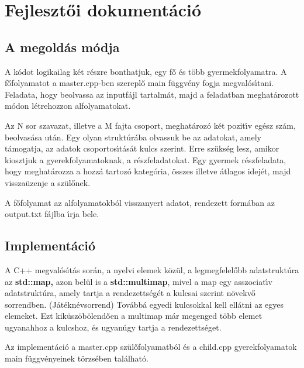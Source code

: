 \documentclass[10pt]{article}
\begin{document}
\section{Fejleszt\H{o}i dokument\'{a}ci\'{o}}
\subsection{A megold\'{a}s m\'{o}dja}

{\normalsize
{\raggedright
A k\'{o}dot logikailag k\'{e}t r\'{e}szre bonthatjuk, egy f\H{o} \'{e}s t\"{o}bb
gyermekfolyamatra. A f\H{o}folyamatot a master.cpp-ben szerepl\H{o} main
f\"{u}ggv\'{e}ny fogja megval\'{o}s\'{\i}tani. Feladata, hogy beolvassa az
inputf\'{a}jl tartalm\'{a}t, majd a feladatban meghat\'{a}rozott m\'{o}don
l\'{e}trehozzon alfolyamatokat.
}
}

{\normalsize
Az N sor szavazat, illetve a M fajta csoport, meghat\'{a}roz\'{o} k\'{e}t
pozit\'{\i}v eg\'{e}sz sz\'{a}m, beolvas\'{a}sa ut\'{a}n. Egy olyan
strukt\'{u}r\'{a}ba olvassuk be az adatokat, amely t\'{a}mogatja, az adatok
csoportos\'{\i}t\'{a}s\'{a}t kulcs szerint. Erre sz\"{u}ks\'{e}g lesz, amikor
kiosztjuk a gyerekfolyamatoknak, a r\'{e}szfeladatokat. Egy gyermek
r\'{e}szfeladata, hogy meghat\'{a}rozza a hozz\'{a} tartoz\'{o} kateg\'{o}ria,
\"{o}sszes illetve \'{a}tlagos idej\'{e}t, majd vissza\"{u}zenje a
sz\"{u}l\H{o}nek.

A f\H{o}folyamat az alfolyamatokb\'{o}l visszanyert adatot, rendezett
form\'{a}ban az output.txt f\'{a}jlba \'{\i}rja bele.
}

\subsection{Implement\'{a}ci\'{o}}

{\normalsize
{\raggedright
A C++ megval\'{o}s\'{\i}t\'{a}s sor\'{a}n, a nyelvi elemek k\"{o}z\"{u}l, a
legmegfelel\H{o}bb adatstrukt\'{u}ra az \textbf{std::map, } azon bel\"{u}l is a
\textbf{std::multimap}, mivel a map egy asszociat\'{\i}v adatstrukt\'{u}ra, amely
tartja a rendezetts\'{e}g\'{e}t a kulcsai szerint n\"{o}vekv\H{o} sorrendben.
(J\'{a}t\'{e}kn\'{e}vsorrend) Tov\'{a}bb\'{a} egyedi kulcsokkal kell ell\'{a}tni
az egyes elemeket. Ezt kik\"{u}sz\"{o}b\"{o}lend\H{o}en a multimap m\'{a}r
megenged t\"{o}bb elemet ugyanahhoz a kulcshoz, \'{e}s ugyan\'{u}gy tartja a
rendezetts\'{e}get.
}}

{\normalsize
{\raggedright
Az implement\'{a}ci\'{o} a master.cpp sz\"{u}l\H{o}folyamatb\'{o}l \'{e}s a
child.cpp gyerekfolyamatok main f\"{u}ggv\'{e}nyeinek t\"{o}rzs\'{e}ben
tal\'{a}lhat\'{o}.
}}
\end{document}
